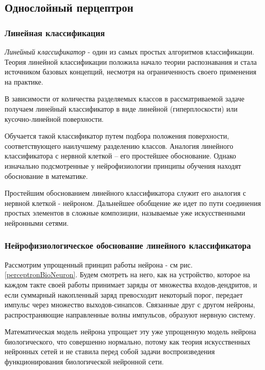 \documentclass[../body.tex]{subfiles}
\begin{document}
\subsection{Однослойный перцептрон}
\subsubsection{Линейная классификация}

\textit{Линейный классификатор} \cite{vorontsov} - один из самых простых алгоритмов классификации. Теория линейной классификации положила начало теории распознавания и стала источником базовых концепций, несмотря на ограниченность своего применения на практике.

В зависимости от количества разделяемых классов в рассматриваемой задаче получаем линейный классификатор в виде линейной (гиперплоскости) или кусочно-линейной поверхности.

Обучается такой классификатор путем подбора положения поверхности, соответствующего наилучшему разделению классов.
Аналогия линейного классификатора с нервной клеткой – его простейшее обоснование. Однако изначально подсмотренные у нейрофизиологии принципы обучения находят обоснование в математике.

Простейшим обоснованием линейного классификатора служит его аналогия с нервной клеткой - нейроном. Дальнейшее обобщение же идет по пути соединения простых элементов в сложные композиции, называемые уже искусственными нейронными сетями.

\subsubsection{Нейрофизиологическое обоснование линейного классификатора}

Рассмотрим упрощенный принцип работы нейрона - см рис. \ref{perceptronBioNeuron}. Будем смотреть на него, как на устройство, которое на каждом такте своей работы принимает заряды от множества входов-дендритов, и если суммарный накопленный заряд превосходит некоторый порог, передает импульс через множество выходов-синапсов. Связанные друг с другом нейроны, распространяющие направленные волны импульсов, образуют нервную систему. 

Математическая модель нейрона упрощает эту уже упрощенную модель нейрона биологического, что совершенно нормально, потому как теория искусственных нейронных сетей и не ставила перед собой задачи воспроизведения функционирования биологической нейронной сети.
\end{document}
